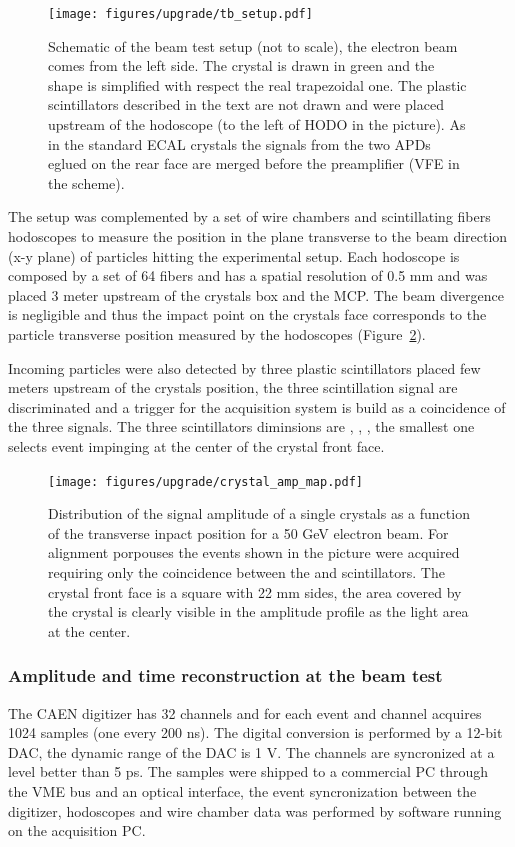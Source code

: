\begin{figure}[h!]
  \centering
  \texttt{[image: figures/upgrade/tb\_setup.pdf]}
  \caption{Schematic of the beam test setup (not to scale), the electron beam comes from the left side.
    The \PbWO crystal is drawn in green and the shape is simplified with
    respect the real trapezoidal one. The plastic scintillators described in the text are not drawn and were placed
    upstream of the hodoscope (to the left of HODO in the picture). As in the standard ECAL crystals the signals from the two APDs
    eglued on the rear face are merged before the preamplifier (VFE in the scheme).}
  \label{fig:tb_setup}
\end{figure}
  
The setup was complemented by a set of wire chambers and scintillating fibers hodoscopes to measure the position in the plane
transverse to the beam direction (x-y plane) of particles hitting the experimental setup.
Each hodoscope is composed by a set of 64 fibers and has a spatial resolution of 0.5 mm and was placed
3 meter upstream of the crystals box and the MCP. The beam divergence is negligible and thus the impact point on the crystals
face corresponds to the particle transverse position measured by the hodoscopes (Figure~\ref{fig:crystal_amp_map}).

Incoming particles were also detected by three plastic scintillators placed few meters upstream of the crystals position, the
three scintillation signal are discriminated and a trigger for the acquisition system is build as a coincidence of the three signals.
The three scintillators diminsions are \sixbysix, \threebythree, \onebyone, the smallest one selects event impinging at the
center of the \twobytwo crystal front face.

\begin{figure}[h!]
  \centering
  \texttt{[image: figures/upgrade/crystal\_amp\_map.pdf]}
  \caption{Distribution of the signal amplitude of a single crystals as a function of the transverse inpact position for
    a 50 GeV electron beam. For alignment porpouses the events shown in the picture
    were acquired requiring only the coincidence between the \sixbysix and \threebythree scintillators.
    The crystal front face is a square with 22 mm sides, the area covered by the crystal is clearly visible in the amplitude
    profile as the light area at the center.}
  \label{fig:crystal_amp_map}
\end{figure}

\subsubsection{Amplitude and time reconstruction at the beam test}
The CAEN digitizer has 32 channels and for each event and channel acquires 1024 samples (one every 200 ns). The
digital conversion is performed by a 12-bit DAC, the dynamic range of the DAC is 1 V.
The channels are syncronized at a level better than 5 ps.
The samples were shipped to a commercial PC through the VME bus and an optical interface, the event
syncronization between the digitizer, hodoscopes and wire chamber data was performed by software running on the
acquisition PC.


